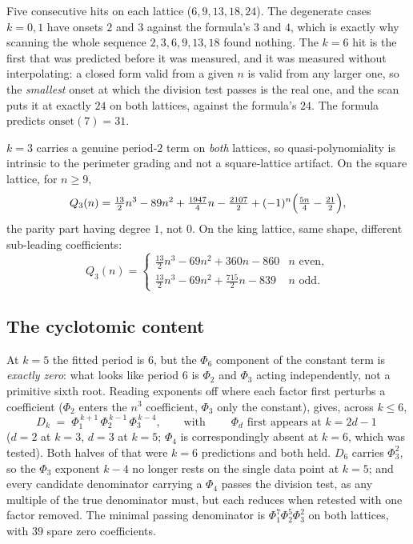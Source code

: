 \documentclass[11pt]{article}
\newcommand{\Phid}{\Phi}
\begin{document}
Five consecutive hits on each lattice ($6, 9, 13, 18, 24$). The degenerate
cases $k = 0, 1$ have onsets $2$ and $3$ against the formula's $3$ and $4$,
which is exactly why scanning the whole sequence $2,3,6,9,13,18$ found nothing.
The $k = 6$ hit is the first that was predicted before it was measured, and it
was measured without interpolating: a closed form valid from a given $n$ is
valid from any larger one, so the \emph{smallest} onset at which the division
test passes is the real one, and the scan puts it at exactly $24$ on both
lattices, against the formula's $24$. The formula predicts
$\mathrm{onset}(7) = 31$.

$k = 3$ carries a genuine period-$2$ term on \emph{both}
lattices, so quasi-polynomiality is intrinsic to the perimeter grading and not a
square-lattice artifact. On the square lattice, for $n \ge 9$,
\[
  Q_3(n) = \tfrac{13}{2}n^3 - 89n^2 + \tfrac{1947}{4}n - \tfrac{2107}{2}
           + (-1)^n\Bigl(\tfrac{5n}{4} - \tfrac{21}{2}\Bigr),
\]
the parity part having degree $1$, not $0$. On the king lattice, same shape,
different sub-leading coefficients:
\[
  Q_3(n) = \begin{cases}
    \tfrac{13}{2}n^3 - 69n^2 + 360n - 860 & n \text{ even},\\[2pt]
    \tfrac{13}{2}n^3 - 69n^2 + \tfrac{715}{2}n - 839 & n \text{ odd}.
  \end{cases}
\]

\subsection{The cyclotomic content}
\label{sec:cyclo}

At $k = 5$ the fitted period is $6$, but the $\Phid_6$ component of the constant
term is \emph{exactly zero}: what looks like period $6$ is $\Phid_2$ and
$\Phid_3$ acting independently, not a primitive sixth root. Reading exponents off
where each factor first perturbs a coefficient ($\Phid_2$ enters the $n^3$
coefficient, $\Phid_3$ only the constant), gives, across $k \le 6$,
\[
  D_k \;=\; \Phid_1^{\,k+1}\,\Phid_2^{\,k-1}\,\Phid_3^{\,k-4},
  \qquad\text{with}\qquad
  \boxed{\;\Phid_d \text{ first appears at } k = 2d-1\;}
\]
($d=2$ at $k=3$, $d=3$ at $k=5$; $\Phid_4$ is correspondingly absent at
$k = 6$, which was tested). Both halves of that were $k = 6$ predictions and
both held. $D_6$ carries $\Phid_3^2$, so the $\Phid_3$ exponent $k-4$ no longer
rests on the single data point at $k = 5$; and every candidate denominator
carrying a $\Phid_4$ passes the division test, as any multiple of the true
denominator must, but each reduces when retested with one factor removed. The
minimal passing denominator is $\Phid_1^7\Phid_2^5\Phid_3^2$ on both lattices,
with $39$ spare zero coefficients.
\end{document}
